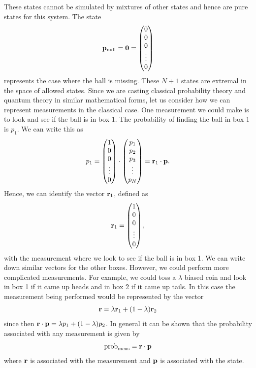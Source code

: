 \documentclass[10pt]{article}
\begin{document}
These states cannot be simulated by mixtures of other states and hence
are pure states for this system.
The state
\begin{equation}
{\bf p}_{\rm null}= {\bf 0} =
\left( \begin{matrix} 0 \\ 0 \\ 0 \\ \vdots \\ 0 \end{matrix} \right)
\end{equation}
represents the case where the ball is missing.
These $N+1$ states are extremal in the space of allowed states.
Since we are casting classical
probability theory and quantum theory in similar mathematical forms,
let us consider how we can represent measurements in the classical case.
One measurement we could make is to look and see if the ball is in box
1.  The probability of finding the ball in box 1 is $p_1$. We can write
this as
\begin{equation}
p_1=
\left(   \begin{matrix} 1 \\ 0 \\ 0 \\ \vdots \\ 0 \end{matrix} \right)
\cdot
\left(   \begin{matrix} p_1 \\ p_2 \\ p_3 \\ \vdots \\ p_N \end{matrix} \right)
={\bf r}_1\cdot {\bf p}.
\end{equation}
Hence, we can identify the vector ${\bf r}_1$, defined as
\begin{equation}
{\bf r}_1= \left(
\begin{matrix} 1 \\ 0 \\ 0 \\ \vdots \\ 0 \end{matrix} \right),
\end{equation}
with the measurement where we look to see if the ball is in box 1. We
can write down similar vectors for the other boxes.  However, we could
perform more complicated measurements.  For example, we could toss a
$\lambda$ biased coin and look in box 1 if it came up heads and in box 2
if it came up tails.  In this case the measurement being performed would
be represented by the vector
\begin{equation}
{\bf r}=\lambda{\bf r}_1+(1-\lambda){\bf r}_2
\end{equation}
since then ${\bf r}\cdot{\bf p}=\lambda p_1 + (1-\lambda)p_2$.
In general it can be shown that the probability associated with any
measurement is given by
\begin{equation}
{\rm prob}_{\rm meas} = {\bf r}\cdot{\bf p}
\end{equation}
where ${\bf r}$ is associated with the measurement and ${\bf p}$ is
associated with the state.
\end{document}
